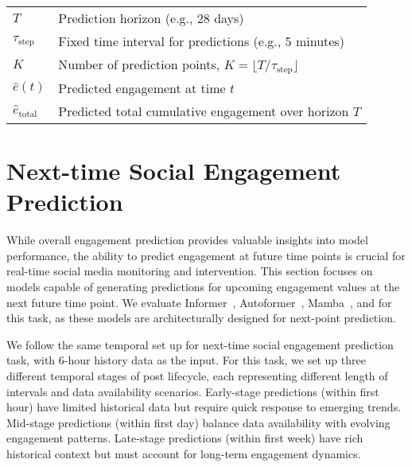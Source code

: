 \begin{table}[htb]
\begin{adjustbox}{max width=1.0\linewidth}
\begin{tabular}{ll}
$T$ & Prediction horizon (e.g., 28 days) \\
$\tau_{\text{step}}$ & Fixed time interval for predictions (e.g., 5 minutes) \\
$K$ & Number of prediction points, $K = \lfloor T / \tau_{\text{step}} \rfloor$ \\
$\hat{e}(t)$ & Predicted engagement at time $t$ \\
$\hat{e}_{\text{total}}$ & Predicted total cumulative engagement over horizon $T$ \\
\bottomrule
\bottomrule
\end{tabular}
\end{adjustbox}
\end{table}



\section{Next-time Social Engagement Prediction}
\label{sec:next_token_pred}
While overall engagement prediction provides valuable insights into model performance, the ability to predict engagement at future time points is crucial for real-time social media monitoring and intervention. This section focuses on models capable of generating predictions for upcoming engagement values at the next future time point. We evaluate Informer~\cite{zhou2021informer}, Autoformer~\cite{wu2021autoformer}, Mamba~\cite{mamba2}, and \icmamba for this task, as these models are architecturally designed for next-point prediction.

We follow the same temporal set up for next-time social engagement prediction task, with 6-hour history data as the input.
For this task, we set up three different temporal stages of post lifecycle, each representing different length of intervals and data availability scenarios. 
Early-stage predictions (within first hour) have limited historical data but require quick response to emerging trends. 
Mid-stage predictions (within first day) balance data availability with evolving engagement patterns. 
Late-stage predictions (within first week) have rich historical context but must account for long-term engagement dynamics.

